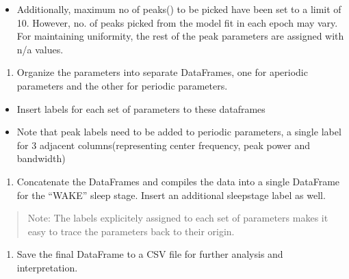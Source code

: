 \documentclass[letterpaper,10pt,english]{sphinxmanual}
\begin{document}
\begin{itemize}
\item {} 
\sphinxAtStartPar
Additionally, maximum no of peaks() to be picked have been set to a limit of 10. However, no. of peaks picked from the model fit in each epoch may vary. For maintaining uniformity, the rest of the peak parameters are assigned with n/a values.

\end{itemize}
\begin{enumerate}
%
\setcounter{enumi}{21}
\item {} 
\sphinxAtStartPar
Organize the parameters into separate DataFrames, one for aperiodic parameters and the other for periodic parameters.

\end{enumerate}
\begin{itemize}
\item {} 
\sphinxAtStartPar
Insert labels for each set of parameters to these dataframes

\item {} 
\sphinxAtStartPar
Note that peak labels need to be added to periodic parameters, a single label for 3 adjacent columns(representing center frequency, peak power and bandwidth)

\end{itemize}
\begin{enumerate}
%
\setcounter{enumi}{5}
\item {} 
\sphinxAtStartPar
Concatenate the DataFrames and compiles the data into a single DataFrame for the “WAKE” sleep stage. Insert an additional sleepstage label as well.

\end{enumerate}
\begin{quote}

\sphinxAtStartPar
Note: The labels explicitely assigned to each set of parameters makes it easy to trace the parameters back to their origin.
\end{quote}
\begin{enumerate}
%
\setcounter{enumi}{6}
\item {} 
\sphinxAtStartPar
Save the final DataFrame to a CSV file for further analysis and interpretation.

\end{enumerate}
\end{document}

